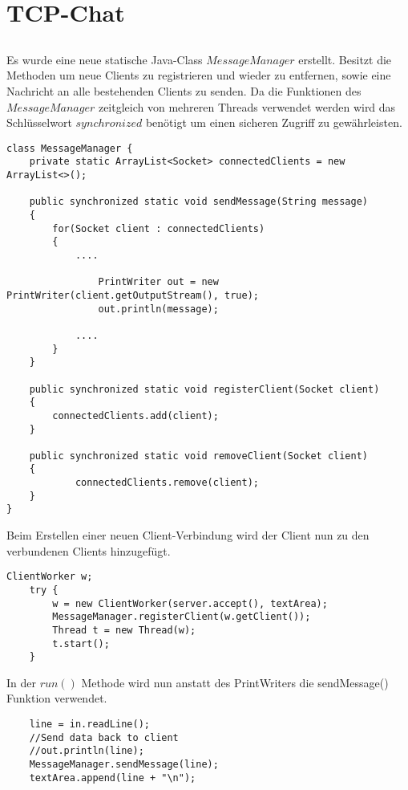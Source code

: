 \documentclass[12pt]{article}
\theoremstyle{plain}
\begin{document}
\section{TCP-Chat}
\subsection{}
\subsection{}
\subsection{}
Es wurde eine neue statische Java-Class $MessageManager$ erstellt.
Besitzt die Methoden um neue Clients zu registrieren und wieder zu entfernen, sowie eine Nachricht an alle bestehenden Clients zu senden.
Da die Funktionen des $MessageManager$ zeitgleich von mehreren Threads verwendet werden wird das Schlüsselwort $synchronized$ benötigt um einen sicheren Zugriff zu gewährleisten.
\begin{lstlisting}
class MessageManager {
	private static ArrayList<Socket> connectedClients = new ArrayList<>();

	public synchronized static void sendMessage(String message)
	{
		for(Socket client : connectedClients)
		{
			....
				
				PrintWriter out = new PrintWriter(client.getOutputStream(), true);
				out.println(message);

			....
		}
	}

	public synchronized static void registerClient(Socket client)
	{
		connectedClients.add(client);
	}

	public synchronized static void removeClient(Socket client)
	{
			connectedClients.remove(client);
	}
}
\end{lstlisting}
Beim Erstellen einer neuen Client-Verbindung wird der Client nun zu den verbundenen Clients hinzugefügt.
\begin{lstlisting}
ClientWorker w;
	try {
		w = new ClientWorker(server.accept(), textArea);
		MessageManager.registerClient(w.getClient());
		Thread t = new Thread(w);
		t.start();
	}
\end{lstlisting}
In der $run()$ Methode wird nun anstatt des PrintWriters die sendMessage() Funktion verwendet.
\begin{lstlisting}
	line = in.readLine();
	//Send data back to client
	//out.println(line);
	MessageManager.sendMessage(line);
	textArea.append(line + "\n");
\end{lstlisting}
\end{document}
